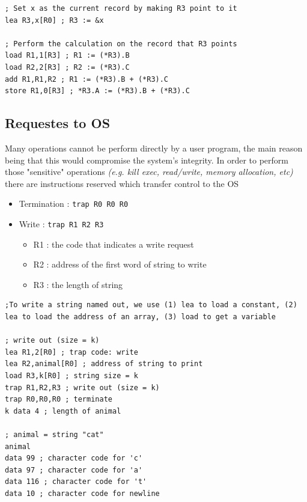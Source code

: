 \documentclass[english,course]{Notes}
\newcommand{\ita}[1]{\textit{#1}}
\newcommand{\code}{\texttt}
\begin{document}

\begin{lstlisting}
; Set x as the current record by making R3 point to it
lea R3,x[R0] ; R3 := &x

; Perform the calculation on the record that R3 points
load R1,1[R3] ; R1 := (*R3).B
load R2,2[R3] ; R2 := (*R3).C
add R1,R1,R2 ; R1 := (*R3).B + (*R3).C
store R1,0[R3] ; *R3.A := (*R3).B + (*R3).C
\end{lstlisting}

\subsection{Requestes to OS}

\par{Many operations cannot be perform directly by a user program, the main reason being that this would compromise the system's integrity. In order to perform those "sensitive" operations \ita{(e.g. kill exec, read/write, memory allocation, etc)} there are instructions reserved which transfer control to the OS}



\begin{itemize}
	\item[]Termination : \code{trap R0 R0 R0}
	\item[]Write : \code{trap R1 R2 R3}
		\begin{itemize}
		\item R1 :  the code that indicates a write request
\item R2 : address of the first word of string to write
\item R3 : the length of string
		\end{itemize}
\end{itemize}

\begin{lstlisting}
;To write a string named out, we use (1) lea to load a constant, (2) lea to load the address of an array, (3) load to get a variable

; write out (size = k)
lea R1,2[R0] ; trap code: write
lea R2,animal[R0] ; address of string to print
load R3,k[R0] ; string size = k
trap R1,R2,R3 ; write out (size = k)
trap R0,R0,R0 ; terminate
k data 4 ; length of animal

; animal = string "cat"
animal
data 99 ; character code for 'c'
data 97 ; character code for 'a'
data 116 ; character code for 't'
data 10 ; character code for newline
\end{lstlisting}
\end{document}
